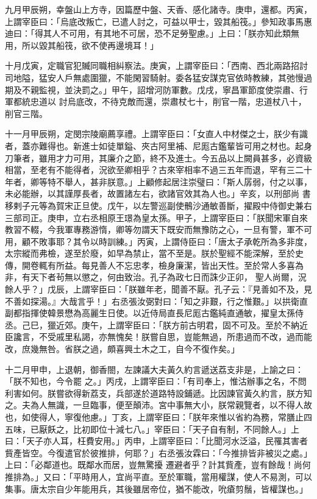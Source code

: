 \begin{pinyinscope}
 九月甲辰朔，幸盤山上方寺，因篇歷中盤、天香、感化諸寺。庚申，還都。丙寅，上謂宰臣曰：「烏底改叛亡，已遣人討之，可益以甲士，毀其船筏。」參知政事馬惠迪曰：「得其人不可用，有其地不可居，恐不足勞聖慮。」上曰：「朕亦知此類無用，所以毀其船筏，欲不使再邊境耳！」



 十月戊寅，定職官犯贓同職相糾察法。庚寅，上謂宰臣曰：「西南、西北兩路招討司地隘，猛安人戶無處圍獵，不能閑習騎射。委各猛安謀克官依時教練，其弛慢過期及不親監視，並決罰之。」甲午，詔增河防軍數。戊戌，寧昌軍節度使崇肅、行軍都統忠道以
 討烏底改，不待克敵而還，崇肅杖七十，削官一階，忠道杖八十，削官三階。



 十一月甲辰朔，定閔宗陵廟薦享禮。上謂宰臣曰：「女直人中材傑之士，朕少有識者，蓋亦難得也。新進士如徒單鎰、夾古阿里補、尼厖古鑑輩皆可用之材也。起身刀筆者，雖用才力可用，其廉介之節，終不及進士。今五品以上闕員甚多，必資級相當，至老有不能得者，況欲至卿相乎？古來宰相率不過三五年而退，罕有三二十年者，卿等特不舉人，甚非朕意。」上顧修起居注崇璧曰：「斯人孱弱，付之以事，未必能辦，以其謹厚長者，故置諸左右，欲諸官效其為人也。」辛亥，以刑部尚
 書移剌子元等為賀宋正旦使。戊午，以左警巡副使鶻沙通敏善斷，擢殿中侍御史兼右三部司正。庚申，立右丞相原王璟為皇太孫。甲子，上謂宰臣曰：「朕聞宋軍自來教習不輟，今我軍專務游惰，卿等勿謂天下既安而無豫防之心，一旦有警，軍不可用，顧不敗事耶？其令以時訓練。」丙寅，上謂侍臣曰：「唐太子承乾所為多非度，太宗縱而弗檢，遂至於廢，如早為禁止，當不至是。朕於聖經不能深解，至於史傳，開卷輒有所益。每見善人不忘忠孝，檢身廉潔，皆出天性。至於常人多喜為非，有天下者茍無以懲之，何由致治。孔子為政七日而誅少正卯，
 聖人尚爾，況餘人乎？」戊辰，上謂宰臣曰：「朕雖年老，聞善不厭。孔子云：『見善如不及，見不善如探湯。』大哉言乎！」右丞張汝弼對曰：「知之非艱，行之惟艱。」以拱衛直副都指揮使韓景懋為高麗生日使。以近侍局直長尼厖古鑑純直通敏，擢皇太孫侍丞。己巳，獵近郊。庚午，上謂宰臣曰：「朕方前古明君，固不可及。至於不納近臣讒言，不受戚里私謁，亦無愧矣！朕嘗自思，豈能無過，所患過而不改，過而能改，庶幾無咎。省朕之過，頗喜興土木之工，自今不復作矣。」



 十二月甲申，上退朝，御香閤，左諫議大夫黃久約言遞送荔支非是，上諭之曰：「朕不知也，今令罷
 之。」丙戌，上謂宰臣曰：「有司奉上，惟沽辦事之名，不問利害如何。朕嘗欲得新荔支，兵部遂於道路特設鋪遞。比因諫官黃久約言，朕方知之。夫為人無識，一旦臨事，便至顛沛。宮中事無大小，朕常親覽者，以不得人故也，如使得人，寧復他慮。」丁亥，上謂宰臣曰：「朕年來惟以省約為務，常膳止四五味，已厭飫之，比初即位十減七八。」宰臣曰：「天子自有制，不同餘人。」上曰：「天子亦人耳，枉費安用。」丙申，上謂宰臣曰：「比聞河水泛溢，民罹其害者貲產皆空。今復遣官於彼推排，何耶？」右丞張汝霖曰：「今推排皆非被災之處。」上曰：「必鄰道也。既鄰水而居，豈無驚擾
 遷避者乎？計其貲產，豈有餘哉！尚何推排為。」又曰：「平時用人，宜尚平直。至於軍職，當用權謀，使人不易測，可以集事。唐太宗自少年能用兵，其後雖居帝位，猶不能改，吮瘡剪鬚，皆權謀也。」




\end{pinyinscope}
